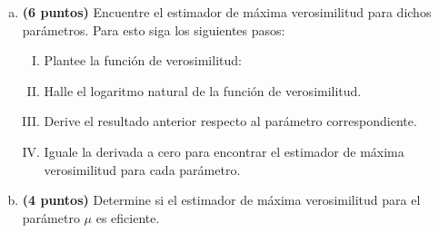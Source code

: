 \documentclass[../main.tex]{subfiles}
\begin{document}
\begin{enumerate}[(a)]

\item \textbf{(6 puntos)} Encuentre el estimador de máxima verosimilitud para dichos parámetros. Para esto siga los siguientes pasos:

\begin{enumerate}[(I)]

\item Plantee la función de verosimilitud:

\item Halle el logaritmo natural de la función de verosimilitud.

\item Derive el resultado anterior respecto al parámetro correspondiente.

\item Iguale la derivada a cero para encontrar el estimador de máxima verosimilitud para
cada parámetro.

\end{enumerate}

\item \textbf{(4 puntos)} Determine si el estimador de máxima verosimilitud para el parámetro $\mu$ es eficiente.

\end{enumerate}
\end{document}
